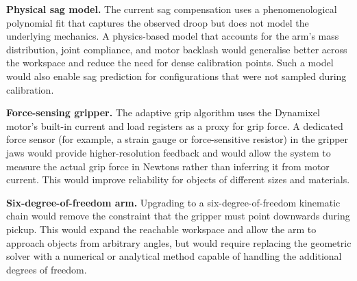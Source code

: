 \textbf{Physical sag model.} The current sag compensation uses
a phenomenological polynomial fit that captures the observed
droop but does not model the underlying mechanics. A
physics-based model that accounts for the arm's mass
distribution, joint compliance, and motor backlash would
generalise better across the workspace and reduce the need
for dense calibration points. Such a model would also enable
sag prediction for configurations that were not sampled
during calibration.

\textbf{Force-sensing gripper.} The adaptive grip algorithm
uses the Dynamixel motor's built-in current and load registers
as a proxy for grip force. A dedicated force sensor
(for example, a strain gauge or force-sensitive resistor) in
the gripper jaws would provide higher-resolution feedback and
would allow the system to measure the actual grip force in
Newtons rather than inferring it from motor current. This
would improve reliability for objects of different sizes and
materials.

\textbf{Six-degree-of-freedom arm.} Upgrading to a
six-degree-of-freedom kinematic chain would remove the
constraint that the gripper must point downwards during
pickup. This would expand the reachable workspace and allow
the arm to approach objects from arbitrary angles, but would
require replacing the geometric solver with a numerical or
analytical method capable of handling the additional degrees
of freedom.
